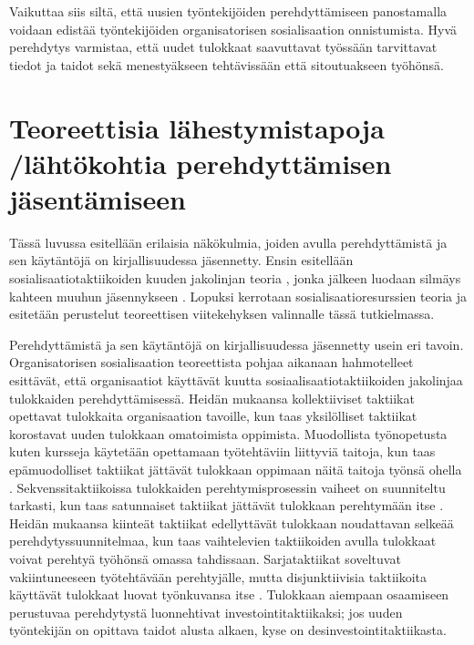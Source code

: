 \documentclass[utf8]{gradu3}
\begin{document}
Vaikuttaa siis siltä, että uusien työntekijöiden perehdyttämiseen panostamalla voidaan edistää työntekijöiden organisatorisen sosialisaation onnistumista. Hyvä perehdytys varmistaa, että uudet tulokkaat saavuttavat työssään tarvittavat tiedot ja taidot sekä menestyäkseen tehtävissään että sitoutuakseen työhönsä.


\section{Teoreettisia lähestymistapoja /lähtökohtia perehdyttämisen jäsentämiseen}
\label{luku-teoreettisia-lähestymistapoja-perehdyttämiseen}

Tässä luvussa esitellään erilaisia näkökulmia, joiden avulla perehdyttämistä ja sen käytäntöjä on kirjallisuudessa jäsennetty. Ensin esitellään sosialisaatiotaktiikoiden kuuden jakolinjan teoria \parencite{van-maanen-schein-1979}, jonka jälkeen luodaan silmäys kahteen muuhun jäsennykseen \parencite{bauer-2010}. Lopuksi kerrotaan sosialisaatioresurssien teoria \parencite{saks-gruman-2012} ja esitetään perustelut teoreettisen viitekehyksen valinnalle tässä tutkielmassa.


Perehdyttämistä ja sen käytäntöjä on kirjallisuudessa jäsennetty usein eri tavoin. Organisatorisen sosialisaation teoreettista pohjaa aikanaan hahmotelleet \textcite{van-maanen-schein-1979} esittävät, että organisaatiot käyttävät kuutta sosiaalisaatiotaktiikoiden jakolinjaa tulokkaiden perehdyttämisessä. Heidän mukaansa kollektiiviset taktiikat opettavat tulokkaita organisaation tavoille, kun taas yksilölliset taktiikat korostavat uuden tulokkaan omatoimista oppimista. Muodollista työnopetusta kuten kursseja käytetään opettamaan työtehtäviin liittyviä taitoja, kun taas epämuodolliset taktiikat jättävät tulokkaan oppimaan näitä taitoja työnsä ohella \parencite{van-maanen-schein-1979}. Sekvenssitaktiikoissa tulokkaiden perehtymisprosessin vaiheet on suunniteltu tarkasti, kun taas satunnaiset taktiikat jättävät tulokkaan perehtymään itse \parencite{van-maanen-schein-1979}. Heidän mukaansa kiinteät taktiikat edellyttävät tulokkaan noudattavan selkeää perehdytyssuunnitelmaa, kun taas vaihtelevien taktiikoiden avulla tulokkaat voivat perehtyä työhönsä omassa tahdissaan. Sarjataktiikat soveltuvat vakiintuneeseen työtehtävään perehtyjälle, mutta disjunktiivisia taktiikoita käyttävät tulokkaat luovat työnkuvansa itse \parencite{van-maanen-schein-1979}. Tulokkaan aiempaan osaamiseen perustuvaa perehdytystä \textcite{van-maanen-schein-1979} luonnehtivat investointitaktiikaksi; jos uuden työntekijän on opittava taidot alusta alkaen, kyse on desinvestointitaktiikasta.
\end{document}
